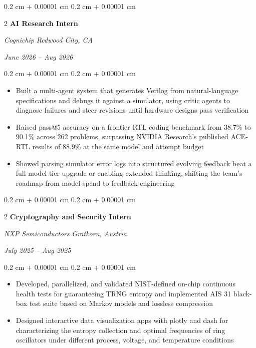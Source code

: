 \documentclass[10pt, letterpaper]{article}
\newenvironment{highlights}{ \begin{itemize}[ topsep=0.10 cm, parsep=0.10 cm, partopsep=0pt,
itemsep=0pt, leftmargin=0.4 cm + 10pt ] }{ \end{itemize} } %
\newenvironment{onecolentry}{ \begin{adjustwidth}{ 0.2 cm + 0.00001 cm }{ 0.2 cm + 0.00001 cm }
}{ \end{adjustwidth} } %
\newenvironment{twocolentry}[2][]{ \onecolentry \def\secondColumn{#2} \setcolumnwidth{\fill, 4.5 cm}
\begin{paracol}{2} }{ \switchcolumn \raggedleft \secondColumn \end{paracol}
\endonecolentry } %
\begin{document}
    \begin{twocolentry}
		{ \textit{Redwood City, CA}

		\textit{June 2026 – Aug 2026}} \textbf{AI Research Intern}

		\textit{Cognichip}
	\end{twocolentry}

	\vspace{0.10 cm}
	\begin{onecolentry}
		\begin{highlights}
    		\item  Built a multi-agent system that generates Verilog from natural-language specifications and debugs it against a simulator, using critic agents to diagnose failures and steer revisions until hardware designs pass verification
            \item Raised pass@5 accuracy on a frontier RTL coding benchmark from 38.7\% to 90.1\% across 262 problems, surpassing NVIDIA Research's published ACE-RTL results of 88.9\% at the same model and attempt budget
            \item Showed parsing simulator error logs into structured evolving feedback beat a full model-tier upgrade or enabling extended thinking, shifting the team's roadmap from model spend to feedback engineering
		\end{highlights}
	\end{onecolentry}

	\vspace{0.2 cm}

    \begin{twocolentry}
		{ \textit{Gratkorn, Austria}

		\textit{July 2025 – Aug 2025}} \textbf{Cryptography and Security Intern}

		\textit{NXP Semiconductors}
	\end{twocolentry}

	\vspace{0.10 cm}
	\begin{onecolentry}
		\begin{highlights}
    		\item Developed, parallelized, and validated NIST-defined on-chip continuous health tests for guaranteeing TRNG entropy and implemented AIS 31 black-box test suite based on Markov models and lossless compression
            \item Designed interactive data visualization apps with plotly and dash for characterizing the entropy collection and optimal frequencies of ring oscillators under different process, voltage, and temperature conditions
		\end{highlights}
	\end{onecolentry}
\end{document}
